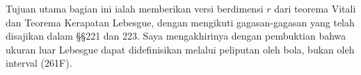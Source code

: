       
\def\dist{\mathop{\text{dist}}} 
      
\def\chaptername{Perubahan variabel dalam integral} 
\def\sectionname{Teorema Vitali dalam $\BbbR^r$} 
      
      
\def\headlinesectionname{Teorema Vitali dalam $\eightBbb R^r$} 
      
Tujuan utama bagian ini ialah memberikan versi berdimensi $r$ dari teorema 
Vitali dan Teorema Kerapatan Lebesgue, dengan mengikuti gagasan-gagasan yang 
telah disajikan dalam \S\S221 dan 223. Saya mengakhirinya dengan pembuktian
bahwa ukuran luar Lebesgue dapat didefinisikan melalui peliputan oleh bola,
bukan oleh interval (261F).
      
